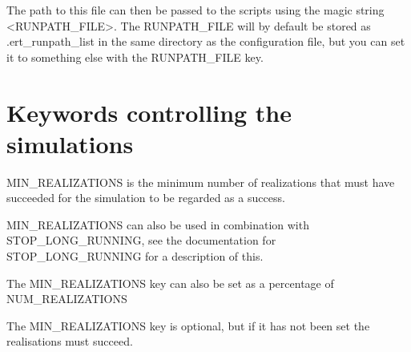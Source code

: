 \documentclass[letterpaper,10pt,english]{sphinxmanual}
\begin{document}
The path to this file can then be passed to the scripts using the
magic string \textless{}RUNPATH\_FILE\textgreater{}. The RUNPATH\_FILE will by default be
stored as .ert\_runpath\_list in the same directory as the configuration
file, but you can set it to something else with the RUNPATH\_FILE key.


\section{Keywords controlling the simulations}
\label{\detokenize{keywords/index:keywords-controlling-the-simulations}}\label{\detokenize{keywords/index:id3}}\label{\detokenize{keywords/index:min-realizations}}
\begin{sphinxShadowBox}

MIN\_REALIZATIONS is the minimum number of realizations that
must have succeeded for the simulation to be regarded as a
success.

MIN\_REALIZATIONS can also be used in combination with
STOP\_LONG\_RUNNING, see the documentation for STOP\_LONG\_RUNNING
for a description of this.


%
\begin{sphinxVerbatim}[commandchars=\\\{\}]
  
\end{sphinxVerbatim}

The MIN\_REALIZATIONS key can also be set as a percentage of
NUM\_REALIZATIONS

%
\begin{sphinxVerbatim}[commandchars=\\\{\}]
  
\end{sphinxVerbatim}

The MIN\_REALIZATIONS key is optional, but if it has not been
set  the realisations must succeed.
\end{sphinxShadowBox}
\label{\detokenize{keywords/index:stop-long-running}}
\end{document}
